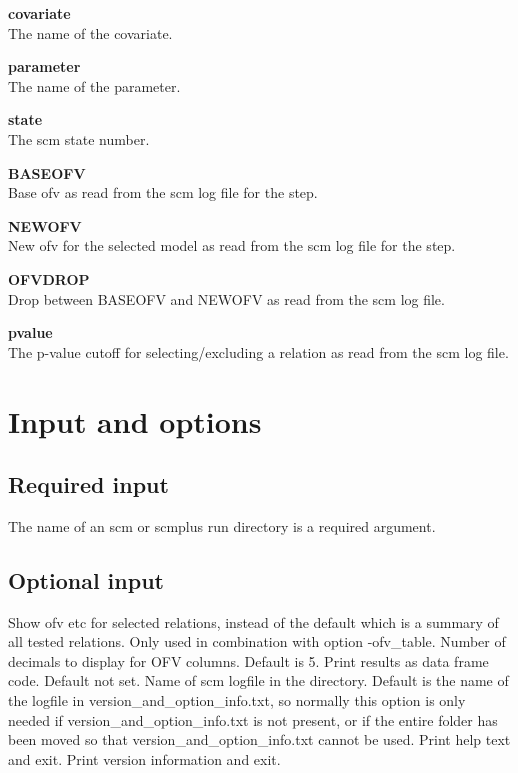 \documentclass[hideglossary,notoc,hidelof,hidelot,hideTheSignaturePage,hideLinkCurrent,hideloa,pdfLatex,noClient,notitle,hideConfidential]{PMXstyle-20190820}
\begin{document}
{\bfseries covariate}\\
The name of the covariate.

{\bfseries parameter}\\
The name of the parameter.

{\bfseries state}\\
The scm state number.

{\bfseries BASEOFV}\\
Base ofv as read from the scm log file for the step.

{\bfseries NEWOFV}\\
New ofv for the selected model as read from the scm log file for the step.

{\bfseries OFVDROP}\\
Drop between BASEOFV and NEWOFV as read from the scm log file.

{\bfseries pvalue}\\
The p-value cutoff for selecting/excluding a relation as read from the scm log file.

\section{Input and options}

\subsection{Required input}
The name of an scm or scmplus run directory is a required argument.

\subsection{Optional input}

\begin{optionlist}
Show ofv etc for selected relations, instead of the default which is
a summary of all tested relations.
\nextopt
{}
Only used in combination with option -ofv\_table.
Number of decimals to display for OFV columns. Default is 5.
\nextopt
{}
Print results as data frame code. Default not set.
\nextopt
{}
Name of scm logfile in the directory. 
Default is the name of the logfile in
version\_and\_option\_info.txt, 
so normally this option is only needed if version\_and\_option\_info.txt is not present,
or if the entire folder has been moved so that version\_and\_option\_info.txt cannot be used.
\nextopt
{}
Print help text and exit.
\nextopt
{}
Print version information and exit.
\nextopt
\end{optionlist}
\end{document}
